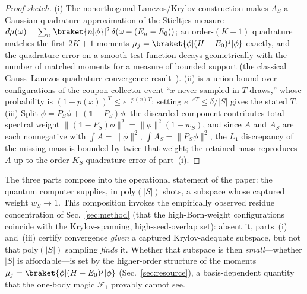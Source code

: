 \begin{proof}[Proof sketch]
(i) The nonorthogonal Lanczos/Krylov construction makes $A_S$ a Gaussian-quadrature approximation
of the Stieltjes measure $d\mu(\omega)=\sum_n\lvert\braket{n|\phi}\rvert^2\,\delta(\omega-(E_n-E_0))$;
an order-$(K{+}1)$ quadrature matches the first $2K+1$ moments
$\mu_j=\braket{\phi|(H-E_0)^{j}|\phi}$ exactly, and the quadrature error on a smooth test function decays
geometrically with the number of matched moments for a measure of bounded support (the classical
Gauss--Lanczos quadrature convergence result~\cite{golub2010}). (ii) is a union bound over configurations of the
coupon-collector event ``$x$ never sampled in $T$ draws,'' whose probability is $(1-p(x))^T\le
e^{-p(x)T}$; setting $e^{-\varepsilon T}\le\delta/|S|$ gives the stated $T$. (iii) Split
$\phi=P_S\phi+(\mathbb{1}-P_S)\phi$: the discarded component contributes total spectral weight
$\lVert(\mathbb{1}-P_S)\phi\rVert^{2}=\lVert\phi\rVert^{2}(1-w_S)$, and since $A$ and $A_S$ are each
nonnegative with $\int A=\lVert\phi\rVert^2$, $\int A_S=\lVert P_S\phi\rVert^2$, the $L_1$ discrepancy
of the missing mass is bounded by twice that weight; the retained mass reproduces $A$ up to the
order-$K_S$ quadrature error of part~(i).
\end{proof}

The three parts compose into the operational statement of the paper: the quantum computer supplies,
in $\mathrm{poly}(|S|)$ shots, a subspace whose captured weight $w_S\to1$. This composition invokes the
empirically observed residue concentration of Sec.~\ref{sec:method} (that the high-Born-weight
configurations coincide with the Krylov-spanning, high-seed-overlap set): absent it, parts~(i) and~(iii)
certify convergence \emph{given} a captured Krylov-adequate subspace, but not that $\mathrm{poly}(|S|)$
sampling \emph{finds} it. Whether that subspace is then
\emph{small}---whether $|S|$ is affordable---is set by the higher-order structure of the moments
$\mu_{j}=\braket{\phi|(H-E_0)^{j}|\phi}$ (Sec.~\ref{sec:resource}), a basis-dependent quantity that the
one-body magic $\mathcal F_1$ provably cannot see.

